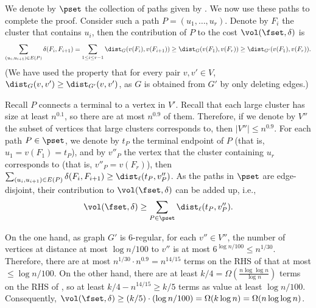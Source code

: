 We denote by $\pset$ the collection of paths given by .
We now use these paths to complete the proof.
%
Consider such a path $P=(u_1,\ldots, u_r)$. Denote by $F_i$ the cluster that contains $u_i$, then the contribution of $P$ to the cost $\vol(\fset,\delta)$ is
\[\sum_{(u_i,u_{i+1})\in E(P)}\delta(F_i,F_{i+1})=\sum_{1\le i\le r-1}\dist_{G}(v(F_i),v(F_{i+1}))\ge \dist_{G}(v(F_1),v(F_{r}))\ge \dist_{G'}(v(F_1),v(F_{r})).\]
(We have used the property that for every pair $v,v'\in V$, $\dist_G(v,v')\ge \dist_{G'}(v,v')$, as $G$ is obtained from $G'$ by only deleting edges.)

Recall $P$ connects a terminal to a vertex in $V'$.
Recall that each large cluster has size at least $n^{0.1}$, so there are at most $n^{0.9}$ of them. Therefore, if we denote by $V''$ the subset of vertices that large clusters corresponds to, then $|V''|\le n^{0.9}$.
For each path $P\in \pset$, we denote by $t_P$ the terminal endpoint of $P$ (that is, $u_1=v(F_1)=t_P$), and by $v''_P$ the vertex that the cluster containing $u_r$ corresponds to (that is, $v''_P=v(F_r)$), then $\sum_{(u_i,u_{i+1})\in E(P)}\delta(F_i,F_{i+1})\ge \dist_{\ell}(t_P,v''_P)$.
As the paths in $\pset$ are edge-disjoint, their contribution to $\vol(\fset,\delta)$ can be added up, i.e., 
\begin{equation}\label{eqn: cost}
\vol(\fset,\delta)\ge \sum_{P\in \pset}\dist_{\ell}(t_P,v''_P).
\end{equation}

On the one hand, as graph $G'$ is $6$-regular, for each $v''\in V''$, the number of vertices at distance at most $\log n/100$ to $v''$ is at most $6^{\log n/100}\le n^{1/30}$. Therefore, there are at most $n^{1/30}\cdot n^{0.9}=n^{14/15}$ terms on the RHS of  that at most $\le \log n/100$.
On the other hand, there are at least $k/4=\Omega(\frac{n\log \log n}{\log n})$ terms on the RHS of , so at least $k/4-n^{14/15}\ge k/5$ terms as value at least $\log n/100$. Consequently, $\vol(\fset,\delta)\ge (k/5)\cdot (\log n/100)=\Omega(k \log n)=\Omega(n\log\log n)$.
















